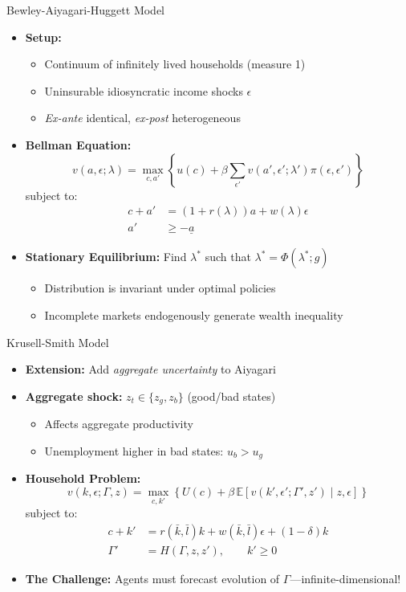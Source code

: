 \documentclass[10pt,english,aspectratio=169]{beamer}
\begin{document}
\begin{frame}{Bewley-Aiyagari-Huggett Model}
\begin{itemize}
\item \textbf{Setup:}
\begin{itemize}
    \item Continuum of infinitely lived households (measure 1)
    \item Uninsurable idiosyncratic income shocks $\epsilon$
    \item \emph{Ex-ante} identical, \emph{ex-post} heterogeneous
\end{itemize}

\medskip
\item \textbf{Bellman Equation:}
\[
v(a,\epsilon;\lambda)=\max_{c,a'}\left\{ u(c)+\beta\sum_{\epsilon'}v(a',\epsilon';\lambda')\pi(\epsilon,\epsilon') \right\}
\]
subject to:
\begin{align*}
c+a' & = (1+r(\lambda))a+w(\lambda)\epsilon \\
a' & \geq -\underline{a}
\end{align*}

\medskip
\item \textbf{Stationary Equilibrium:} Find $\lambda^*$ such that $\lambda^* = \Phi(\lambda^*; g)$
\begin{itemize}
    \item Distribution is invariant under optimal policies
    \item Incomplete markets endogenously generate wealth inequality
\end{itemize}
\end{itemize}
\end{frame}

\begin{frame}{Krusell-Smith Model}
\begin{itemize}
\item \textbf{Extension:} Add \emph{aggregate uncertainty} to Aiyagari

\medskip
\item \textbf{Aggregate shock:} $z_t \in \{z_g, z_b\}$ (good/bad states)
\begin{itemize}
    \item Affects aggregate productivity
    \item Unemployment higher in bad states: $u_b > u_g$
\end{itemize}

\medskip
\item \textbf{Household Problem:}
\[
v(k,\epsilon;\Gamma,z)=\max_{c,k'} \left\{ U(c)+\beta \, \mathbb{E}[v(k',\epsilon';\Gamma',z') \mid z,\epsilon] \right\}
\]
subject to:
\begin{align*}
c+k' &= r(\bar{k},\bar{l})k + w(\bar{k},\bar{l})\epsilon + (1-\delta)k \\
\Gamma' &= H(\Gamma,z,z'), \qquad k' \geq 0
\end{align*}

\medskip
\item \textbf{The Challenge:} Agents must forecast evolution of $\Gamma$---infinite-dimensional!
\end{itemize}
\end{frame}
\end{document}
